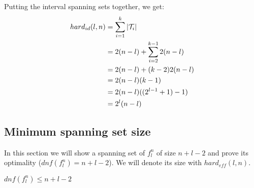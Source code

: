 \hfill

Putting the interval spanning sets together,
we get:
\begin{align*}
hard_{id}(l, n) &= \sum_{i=1}^k{\lvert\mathcal{T}_i\rvert} \\
&= 2 (n-l) + \sum_{i=2}^{k-1}{2 (n-l)} \\
&= 2 (n-l) + (k-2) 2 (n-l) \\
&= 2 (n-l) (k-1) \\
&= 2 (n-l) ((2^{l-1} + 1) - 1) \\
&= 2^l (n-l)
\end{align*}

\subsection{Minimum spanning set size}

In this section we will show a spanning set
of $f^n_l$ of size $n+l-2$
and prove its optimality
($dnf(f^n_l) = n+l-2$).
We will denote its size with
$\mathit{hard}_{\mathit{eff}}(l,n)$.

\begin{lemma}
$dnf(f_l^n) \leq n+l-2$
\end{lemma}

